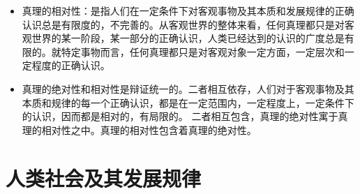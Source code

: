 \documentclass[device=pad,lang=cn,UTF8]{elegantbook}
\begin{document}
\begin{enumerate}
\begin{itemize}
\begin{itemize}
            \end{itemize}
            \item 真理的相对性：是指人们在一定条件下对客观事物及其本质和发展规律的正确认识总是有限度的，不完善的。从客观世界的整体来看，任何真理都只是对客观世界的某一阶段，某一部分的正确认识，人类已经达到的认识的广度总是有限的。就特定事物而言，任何真理都只是对客观对象一定方面，一定层次和一定程度的正确认识。
            \item 真理的绝对性和相对性是辩证统一的。二者相互依存，人们对于客观事物及其本质和规律的每一个正确认识，都是在一定范围内，一定程度上，一定条件下的认识，因而都是相对的，有局限的。
            二者相互包含，真理的绝对性寓于真理的相对性之中。真理的相对性包含着真理的绝对性。
        \end{itemize}
    \end{enumerate}
    \chapter{人类社会及其发展规律}
\end{document}
